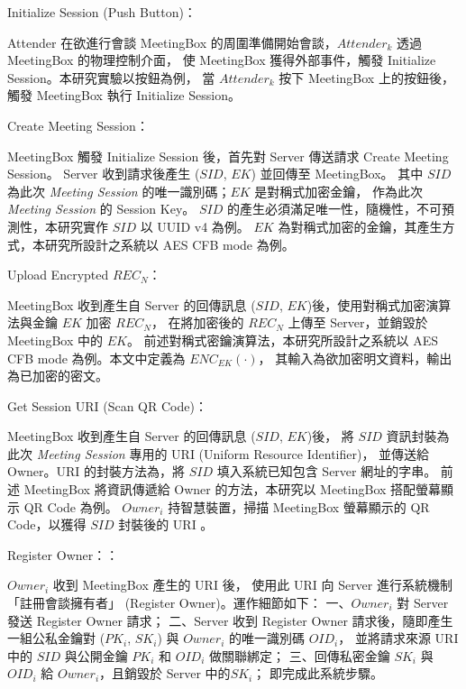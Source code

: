 \begin{steps}
    \item Initialize Session (Push Button)：

            Attender 在欲進行會談 MeetingBox 的周圍準備開始會談，$Attender_{k}$ 透過 MeetingBox 的物理控制介面，
        使 MeetingBox 獲得外部事件，觸發 Initialize Session。本研究實驗以按鈕為例，
        當 $Attender_{k}$ 按下 MeetingBox 上的按鈕後，觸發 MeetingBox 執行 Initialize Session。

    \item Create Meeting Session：

            MeetingBox 觸發 Initialize Session 後，首先對 Server 傳送請求 Create Meeting Session。
        Server 收到請求後產生 ($SID$, $EK$) 並回傳至 MeetingBox。
        其中 $SID$ 為此次 {\it Meeting Session} 的唯一識別碼；$EK$ 是對稱式加密金鑰，
        作為此次 {\it Meeting Session} 的 Session Key。
        $SID$ 的產生必須滿足唯一性，隨機性，不可預測性，本研究實作 $SID$ 以 UUID v4 為例。
        $EK$ 為對稱式加密的金鑰，其產生方式，本研究所設計之系統以 AES CFB mode 為例。

    \item Upload Encrypted $REC_{N}$：

            MeetingBox 收到產生自 Server 的回傳訊息 ($SID$, $EK$)後，使用對稱式加密演算法與金鑰 $EK$ 加密 $REC_{N}$，
        在將加密後的 $REC_{N}$ 上傳至 Server，並銷毀於 MeetingBox 中的 $EK$。
        前述對稱式密鑰演算法，本研究所設計之系統以 AES CFB mode 為例。本文中定義為 $ENC_{EK}(·)$，
        其輸入為欲加密明文資料，輸出為已加密的密文。

    \item Get Session URI (Scan QR Code)：

            MeetingBox 收到產生自 Server 的回傳訊息 ($SID$, $EK$)後，
        將 $SID$ 資訊封裝為此次 {\it Meeting Session} 專用的 URI (Uniform Resource Identifier)，
        並傳送給 Owner。URI 的封裝方法為，將 $SID$ 填入系統已知包含 Server 網址的字串。
        前述 MeetingBox 將資訊傳遞給 Owner 的方法，本研究以 MeetingBox 搭配螢幕顯示 QR Code 為例。
        $Owner_{i}$ 持智慧裝置，掃描 MeetingBox 螢幕顯示的 QR Code，以獲得 $SID$ 封裝後的 URI 。

    \item Register Owner：：

            $Owner_{i}$ 收到 MeetingBox 產生的 URI 後，
        使用此 URI 向 Server 進行系統機制「註冊會談擁有者」 (Register Owner)。運作細節如下：
        一、$Owner_{i}$ 對 Server 發送 Register Owner 請求；
        二、Server 收到 Register Owner 請求後，隨即產生一組公私金鑰對 ($PK_{i}$, $SK_{i}$)
        與 $Owner_{i}$ 的唯一識別碼 $OID_{i}$，
        並將請求來源 URI 中的 $SID$ 與公開金鑰 $PK_{i}$ 和 $OID_{i}$ 做關聯綁定；
        三、回傳私密金鑰 $SK_{i}$ 與 $OID_{i}$ 給 $Owner_{i}$，且銷毀於 Server 中的$SK_{i}$；
        即完成此系統步驟。


\end{steps}
